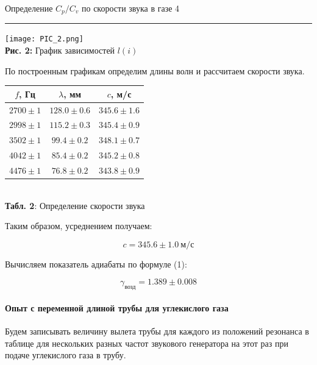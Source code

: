 \documentclass[12pt,a4paper]{scrartcl}
\begin{document}
	\newpage 
	
	
	\begin{flushleft}
		\footnotesize{Определение $C_p /C_v$ по скорости звука в газе} \hspace{\fill} \footnotesize{4}
		\\[-0.3cm]\noindent\rule{\textwidth}{0.3pt}
	\end{flushleft}
	
	\begin{center}
		\texttt{[image: PIC\_2.png]}
		\\\textbf{Рис. 2:} График зависимостей $l(i)$
	\end{center}

	По построенным графикам определим длины волн и рассчитаем скорости звука.
	
	\begin{center}
		\begin{tabular}{|c|c|c|}
			\hline
			$f$, Гц & $\lambda$, мм & $c$, м/с
			\\\hline
			$2700 \pm 1$ & $128.0 \pm 0.6$ & $345.6 \pm 1.6$
			\\\hline
			$2998 \pm 1$ & $115.2 \pm 0.3$ & $345.4 \pm 0.9$
			\\\hline
			$3502 \pm 1$ & $99.4 \pm 0.2$ & $348.1 \pm 0.7$
			\\\hline
			$4042 \pm 1$ & $85.4 \pm 0.2$ & $345.2 \pm 0.8$
			\\\hline
			$4476 \pm 1$ & $76.8 \pm 0.2$ & $343.8 \pm 0.9$
			\\\hline
		\end{tabular}
		\\\textbf{Табл. 2}: Определение скорости звука
	\end{center}

	Таким образом, усреднением получаем:
	
	$$c = 345.6 \pm 1.0\ \text{м}/\text{с}$$
	
	Вычисляем показатель адиабаты по формуле (1):
	
	$$\gamma_{\text{возд}} = 1.389 \pm 0.008$$
	
	\paragraph{Опыт с переменной длиной трубы для углекислого газа} \hfill
	
	Будем записывать величину вылета трубы для каждого из положений резонанса в таблице для нескольких разных частот звукового генератора на этот раз при подаче углекислого газа в трубу.
	
\end{document}
